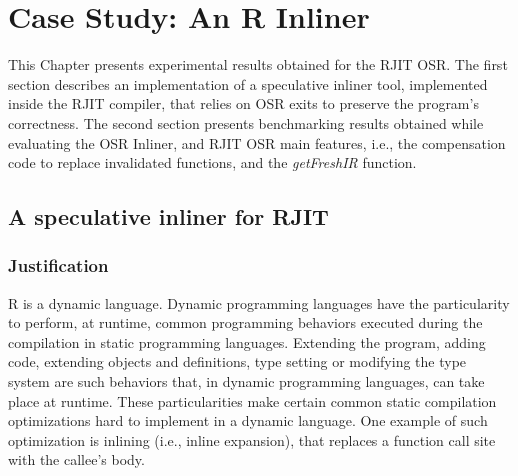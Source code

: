 
\chapter{Case Study: An R Inliner} %

\label{Chapter5} %


\newcommand{\keyword}[1]{\textbf{#1}}
\newcommand{\tabhead}[1]{\textbf{#1}}
\newcommand{\code}[1]{\texttt{#1}}
\newcommand{\file}[1]{\texttt{\bfseries#1}}
\newcommand{\option}[1]{\texttt{\itshape#1}}

This Chapter presents experimental results obtained for the RJIT OSR.
The first section describes an implementation of a speculative inliner tool, implemented inside the RJIT compiler, that relies on OSR exits to preserve the program's correctness.
The second section presents benchmarking results obtained while evaluating the OSR Inliner, and RJIT OSR main features, i.e., the compensation code to replace invalidated functions, and the \textit{getFreshIR} function.\\

\section{A speculative inliner for RJIT}
\subsection{Justification}
R is a dynamic language. 
Dynamic programming languages have the particularity to perform, at runtime, common programming behaviors executed during the compilation in static programming languages.
Extending the program, adding code, extending objects and definitions, type setting or modifying the type system are such behaviors that, in dynamic programming languages, can take place at runtime.
These particularities make certain common static compilation optimizations hard to implement in a dynamic language.
One example of such optimization is inlining (i.e., inline expansion), that replaces a function call site with the callee's body.\\

